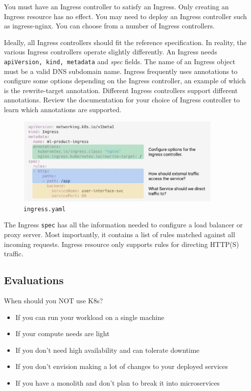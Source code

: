 \documentclass[10pt,a4paper]{report}
\begin{document}
You must have an Ingress controller to satisfy an Ingress. Only creating an Ingress resource has no effect.
You may need to deploy an Ingress controller such as ingress-nginx. You can choose from a number of Ingress controllers.

Ideally, all Ingress controllers should fit the reference specification. In reality, the various Ingress controllers operate slightly differently.
An Ingress needs \texttt{apiVersion, kind, metadata} and \textit{spec} fields. The name of an Ingress object must be a valid DNS subdomain name. Ingress frequently uses annotations to configure some options depending on the Ingress controller, an example of which is the rewrite-target annotation. Different Ingress controllers support different annotations. Review the documentation for your choice of Ingress controller to learn which annotations are supported.

\begin{figure}[h]
	\centering
	\includegraphics[width=0.9\textwidth]{image-ingress-yaml}
	\caption{\texttt{ingress.yaml}}
	\label{image-k8s-ingress-yaml}
\end{figure} 

The Ingress \texttt{spec} has all the information needed to configure a load balancer or proxy server. Most importantly, it contains a list of rules matched against all incoming requests. Ingress resource only supports rules for directing HTTP(S) traffic.

\subsection{Evaluations}
When should you NOT use K8s?
\begin{itemize}
	\item If you can run your workload on a single machine
	\item If your compute needs are light
	\item If you don't need high availability and can tolerate downtime
	\item If you don't envision making a lot of changes to your deployed services
	\item If you have a monolith and don't plan to break it into microservices
\end{itemize}
\end{document}

